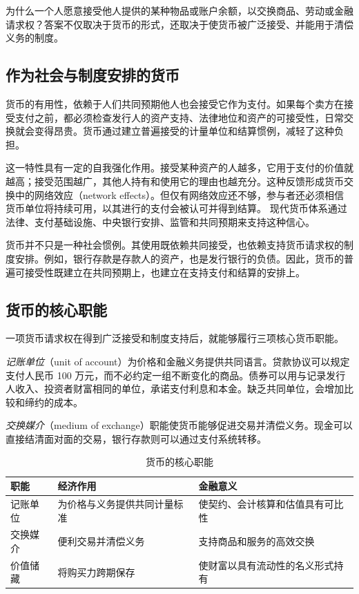 为什么一个人愿意接受他人提供的某种物品或账户余额，以交换商品、劳动或金融请求权？答案不仅取决于货币的形式，还取决于使货币被广泛接受、并能用于清偿义务的制度。

\subsection{作为社会与制度安排的货币}

货币的有用性，依赖于人们共同预期他人也会接受它作为支付。如果每个卖方在接受支付之前，都必须检查发行人的资产支持、法律地位和资产的可接受性，日常交换就会变得昂贵。货币通过建立普遍接受的计量单位和结算惯例，减轻了这种负担。

这一特性具有一定的自我强化作用。接受某种资产的人越多，它用于支付的价值就越高；接受范围越广，其他人持有和使用它的理由也越充分。这种反馈形成货币交换中的网络效应（network effects）。但仅有网络效应还不够，参与者还必须相信货币单位将持续可用，以其进行的支付会被认可并得到结算。
现代货币体系通过法律、支付基础设施、中央银行安排、监管和共同预期来支持这种信心。

货币并不只是一种社会惯例。其使用既依赖共同接受，也依赖支持货币请求权的制度安排。例如，银行存款是存款人的资产，也是发行银行的负债。因此，货币的普遍可接受性既建立在共同预期上，也建立在支持支付和结算的安排上。

\subsection{货币的核心职能}

一项货币请求权在得到广泛接受和制度支持后，就能够履行三项核心货币职能。

\emph{记账单位}（unit of account）为价格和金融义务提供共同语言。贷款协议可以规定支付人民币 100 万元，而不必约定一组不断变化的商品。债券可以用与记录发行人收入、投资者财富相同的单位，承诺支付利息和本金。缺乏共同单位，会增加比较和缔约的成本。

\emph{交换媒介}（medium of exchange）职能使货币能够促进交易并清偿义务。现金可以直接结清面对面的交易，银行存款则可以通过支付系统转移。


\begin{table}[H]
\centering
\caption{货币的核心职能}
\label{tab:ch2-money-functions}
\renewcommand{\arraystretch}{1.4}
\begin{tabularx}{\textwidth}{
    @{}
    >{\raggedright\arraybackslash}p{3.0cm}
    >{\raggedright\arraybackslash}X
    >{\raggedright\arraybackslash}X
    @{}
}
\toprule
\textbf{职能}
& \textbf{经济作用}
& \textbf{金融意义} \\
\midrule

记账单位
& 为价格与义务提供共同计量标准
& 使契约、会计核算和估值具有可比性 \\

交换媒介
& 便利交易并清偿义务
& 支持商品和服务的高效交换 \\

价值储藏
& 将购买力跨期保存
& 使财富以具有流动性的名义形式持有 \\

\bottomrule
\end{tabularx}
\end{table}

